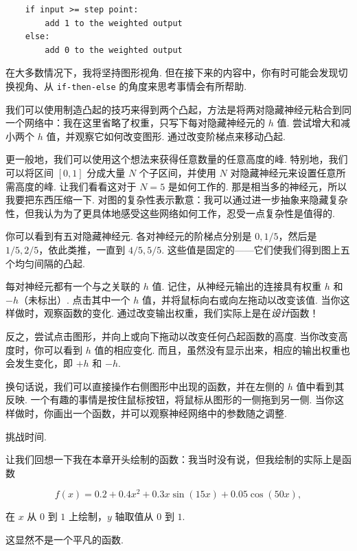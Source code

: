 \begin{lstlisting}
    if input >= step point:
        add 1 to the weighted output
    else:
        add 0 to the weighted output

\end{lstlisting}

在大多数情况下，我将坚持图形视角. 但在接下来的内容中，你有时可能会发现切换视角、从 \texttt{if-then-else} 的角度来思考事情会有所帮助.

我们可以使用制造凸起的技巧来得到两个凸起，方法是将两对隐藏神经元粘合到同一个网络中：我在这里省略了权重，只写下每对隐藏神经元的 $h$ 值. 尝试增大和减小两个 $h$ 值，并观察它如何改变图形. 通过改变阶梯点来移动凸起.

更一般地，我们可以使用这个想法来获得任意数量的任意高度的峰. 特别地，我们可以将区间 $[0, 1]$ 分成大量 $N$ 个子区间，并使用 $N$ 对隐藏神经元来设置任意所需高度的峰. 让我们看看这对于 $N = 5$ 是如何工作的. 那是相当多的神经元，所以我要把东西压缩一下. 对图的复杂性表示歉意：我可以通过进一步抽象来隐藏复杂性，但我认为为了更具体地感受这些网络如何工作，忍受一点复杂性是值得的.

你可以看到有五对隐藏神经元. 各对神经元的阶梯点分别是 $0, 1/5$，然后是 $1/5, 2/5$，依此类推，一直到 $4/5, 5/5$. 这些值是固定的——它们使我们得到图上五个均匀间隔的凸起.

每对神经元都有一个与之关联的 $h$ 值. 记住，从神经元输出的连接具有权重 $h$ 和 $-h$（未标出）. 点击其中一个 $h$ 值，并将鼠标向右或向左拖动以改变该值. 当你这样做时，观察函数的变化. 通过改变输出权重，我们实际上是在\emph{设计}函数！

反之，尝试点击图形，并向上或向下拖动以改变任何凸起函数的高度. 当你改变高度时，你可以看到 $h$ 值的相应变化. 而且，虽然没有显示出来，相应的输出权重也会发生变化，即 $+h$ 和 $-h$.

换句话说，我们可以直接操作右侧图形中出现的函数，并在左侧的 $h$ 值中看到其反映. 一个有趣的事情是按住鼠标按钮，将鼠标从图形的一侧拖到另一侧. 当你这样做时，你画出一个函数，并可以观察神经网络中的参数随之调整.

挑战时间.

让我们回想一下我在本章开头绘制的函数：我当时没有说，但我绘制的实际上是函数

\begin{equation}
f(x) = 0.2+0.4 x^2+0.3x \sin(15 x) + 0.05 \cos(50 x),
\tag{113}
\end{equation}

\noindent 在 $x$ 从 $0$ 到 $1$ 上绘制，$y$ 轴取值从 $0$ 到 $1$.

这显然不是一个平凡的函数.

